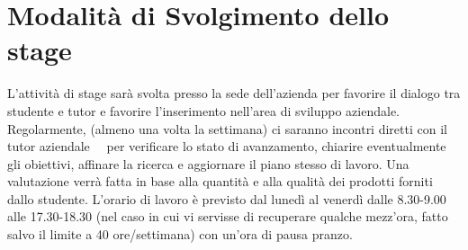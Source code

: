 \section*{Modalità di Svolgimento dello stage}
L’attività di stage sarà svolta presso la sede dell’azienda per favorire il dialogo tra studente e tutor e favorire l’inserimento nell’area di sviluppo aziendale.
Regolarmente, (almeno una volta la settimana) ci saranno incontri diretti con il tutor aziendale \nomeTutorAziendale\ \cognomeTutorAziendale\ per verificare lo stato di avanzamento, chiarire eventualmente gli obiettivi, affinare la ricerca e aggiornare il piano stesso di lavoro.
Una valutazione verrà fatta in base alla quantità e alla qualità dei prodotti forniti dallo studente.
L’orario di lavoro è previsto dal lunedì al venerdì dalle 8.30-9.00 alle 17.30-18.30 (nel caso in cui vi servisse di recuperare qualche mezz'ora, fatto salvo il limite a 40 ore/settimana) con un’ora di pausa pranzo.
